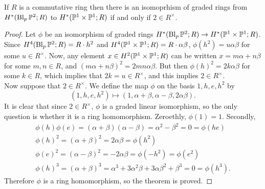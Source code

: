 \documentclass[12pt,a4paper]{article}
\newcommand{\Bl}{\operatorname{Bl}}
\begin{document}
\begin{theorem}
    If $R$ is a commutative ring then there is an isomoprhism of graded rings from $H^*(\Bl_p \P^2; R)$ to $H^*(\P^1 \times \P^1; R)$ if and only if $2 \in R^\times$.
\end{theorem}
\begin{proof}
    Let $\phi$ be an isomorphism of graded rings $H^*(\Bl_p \P^2; R) \to H^*(\P^1 \times \P^1; R)$. Since $H^4(\Bl_p \P^2; R) = R\cdot h^2$ and $H^4(\P^1 \times \P^1; R) = R\cdot \alpha \beta$, $\phi(h^2) = u\alpha \beta$ for some $u \in R^\times$. Now, any element $x \in H^2(\P^1 \times \P^1;R)$ can be written $x=m\alpha + n\beta$ for some $m,n\in R$, and $(m\alpha + n\beta)^2 = 2mn\alpha\beta$. But then $\phi(h)^2 = 2k\alpha\beta$ for some $k \in R$, which implies that $2k=u\in R^\times$, and this implies $2 \in R^\times$.\\
    
    Now suppose that $2 \in R^\times$. We define the map $\phi$ on the basis $1,h,e,h^2$ by
    \begin{equation}
        (1,h,e,h^2) \mapsto (1,\alpha+\beta,\alpha-\beta,2\alpha\beta).
    \end{equation}
    It is clear that since $2 \in R^\times$, $\phi$ is a graded linear isomorphism, so the only question is whether it is a ring homomorphism. Zeroethly, $\phi(1)=1$. Secondly,
    \begin{align}
        \phi(h)\phi(e)=(\alpha+\beta)(\alpha-\beta)=\alpha^2-\beta^2=0=\phi(he) \\
        \phi(h)^2 = (\alpha+\beta)^2 = 2\alpha\beta = \phi(h^2)\\
        \phi(e)^2 = (\alpha - \beta)^2 = -2\alpha\beta = \phi(-h^2) = \phi(e^2)\\
        \phi(h)^3= (\alpha + \beta)^3 = \alpha^3 + 3\alpha^2\beta + 3\alpha\beta^2 + \beta^3 = 0 = \phi(h^3).
    \end{align}
    Therefore $\phi$ is a ring homomorphism, so the theorem is proved.
    
\end{proof}
\end{document}
